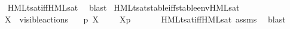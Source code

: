 \begin{isabellebody}
\ \ \isamarkupfalse%
\ HMLt{\isacharunderscore}{\kern0pt}sat{\isacharunderscore}{\kern0pt}iff{\isacharunderscore}{\kern0pt}HML{\isacharunderscore}{\kern0pt}sat\ \isamarkupfalse%
\ blast\isanewline
{}\isamarkupfalse%
\ HMLt{\isacharunderscore}{\kern0pt}sat{\isacharunderscore}{\kern0pt}stable{\isacharunderscore}{\kern0pt}iff{\isacharunderscore}{\kern0pt}stable{\isacharunderscore}{\kern0pt}env{\isacharunderscore}{\kern0pt}HML{\isacharunderscore}{\kern0pt}sat{\isacharcolon}{\kern0pt}\isanewline
\ \ \ {\isacartoucheopen}X\ {\isasymsubseteq}\ visible{\isacharunderscore}{\kern0pt}actions{\isacartoucheclose}\isanewline
\ \ \ {\isacartoucheopen}p\ {\isasymTTurnstile}{\isacharbrackleft}{\kern0pt}X{\isacharbrackright}{\kern0pt}\ {\isasymphi}\ \ {\isasymLongleftrightarrow}\ \ {\isasymtheta}{\isacharbrackleft}{\kern0pt}X{\isacharbrackright}{\kern0pt}{\isacharparenleft}{\kern0pt}p{\isacharparenright}{\kern0pt}\ {\isasymTurnstile}\ {\isasymsigma}{\isacharparenleft}{\kern0pt}{\isasymphi}{\isacharparenright}{\kern0pt}{\isacartoucheclose}\ \isanewline
\ \ \isamarkupfalse%
\ HMLt{\isacharunderscore}{\kern0pt}sat{\isacharunderscore}{\kern0pt}iff{\isacharunderscore}{\kern0pt}HML{\isacharunderscore}{\kern0pt}sat\ assms\ \isamarkupfalse%
\ blast%
\endisatagvisible
{\isafoldvisible}%
%
\isadelimvisible
%
\endisadelimvisible
\isanewline
\isanewline
{}\isamarkupfalse%
\ %
%
\isadelimtheory
%
\endisadelimtheory
%
\isatagtheory
%
\endisatagtheory
{\isafoldtheory}%
%
\isadelimtheory
%
\endisadelimtheory
%
\end{isabellebody}%
\endinput

